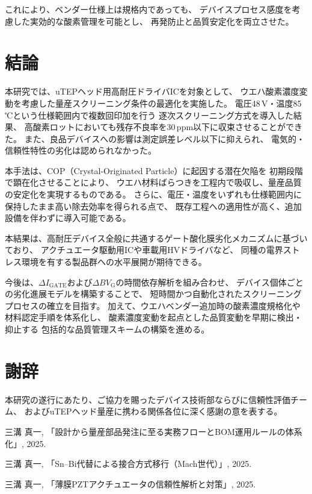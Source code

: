 \documentclass[twocolumn]{ieeetran}
\begin{document}
これにより、ベンダー仕様上は規格内であっても、
デバイスプロセス感度を考慮した実効的な酸素管理を可能とし、
再発防止と品質安定化を両立させた。

\section{結論}

本研究では、uTEPヘッド用高耐圧ドライバICを対象として、
ウエハ酸素濃度変動を考慮した量産スクリーニング条件の最適化を実施した。
電圧48\,V・温度85\,℃という仕様範囲内で複数回印加を行う
逐次スクリーニング方式を導入した結果、
高酸素ロットにおいても残存不良率を30\,ppm以下に収束させることができた。
また、良品デバイスへの影響は測定誤差レベル以下に抑えられ、
電気的・信頼性特性の劣化は認められなかった。

本手法は、COP（Crystal-Originated Particle）に起因する潜在欠陥を
初期段階で顕在化させることにより、
ウエハ材料ばらつきを工程内で吸収し、量産品質の安定化を実現するものである。
さらに、電圧・温度をいずれも仕様範囲内に保持したまま高い除去効率を得られる点で、
既存工程への適用性が高く、追加設備を伴わずに導入可能である。

本結果は、高耐圧デバイス全般に共通するゲート酸化膜劣化メカニズムに基づいており、
アクチュエータ駆動用ICや車載用HVドライバなど、
同種の電界ストレス環境を有する製品群への水平展開が期待できる。

今後は、$\Delta I_\mathrm{GATE}$および$\Delta BV_\mathrm{G}$の時間依存解析を組み合わせ、
デバイス個体ごとの劣化進展モデルを構築することで、
短時間かつ自動化されたスクリーニングプロセスの確立を目指す。
加えて、ウエハベンダー追加時の酸素濃度規格化や材料認定手順を体系化し、
酸素濃度変動を起点とした品質変動を早期に検出・抑止する
包括的な品質管理スキームの構築を進める。

\section*{謝辞}
本研究の遂行にあたり、ご協力を賜ったデバイス技術部ならびに信頼性評価チーム、
およびuTEPヘッド量産に携わる関係各位に深く感謝の意を表する。

\begin{thebibliography}{99}

三溝 真一, 「設計から量産部品発注に至る実務フローとBOM運用ルールの体系化」, 2025.

三溝 真一, 「Sn–Bi代替による接合方式移行（Mach世代）」, 2025.

三溝 真一, 「薄膜PZTアクチュエータの信頼性解析と対策」, 2025.

\end{thebibliography}
\end{document}
